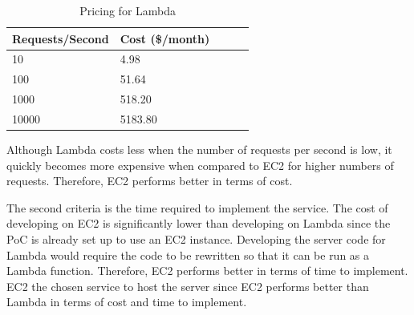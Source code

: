 \documentclass[letterpaper,12pt]{article}
\begin{document}
\begin{table}[H]
	\begin{center}
		\caption{Pricing for Lambda}
        \label{tab:lambdapricing}
        \begin{tabular}{l|l|l|l|l}
        Requests/Second & Cost (\$/month)\\
        \hline
        10 & 4.98\\
        100 & 51.64\\
        1000 & 518.20\\
        10000 & 5183.80\\
        \end{tabular}
	\end{center}
\end{table}

Although Lambda costs less when the number of requests per second is low, it quickly becomes more expensive when compared to EC2 for higher numbers of requests. Therefore, EC2 performs better in terms of cost.\\
\pagebreak

The second criteria is the time required to implement the service. The cost of developing on EC2 is significantly lower than developing on Lambda since the PoC is already set up to use an EC2 instance. Developing the server code for Lambda would require the code to be rewritten so that it can be run as a Lambda function. Therefore, EC2 performs better in terms of time to implement.\\

EC2 the chosen service to host the server since EC2 performs better than Lambda in terms of cost and time to implement.
\end{document}
